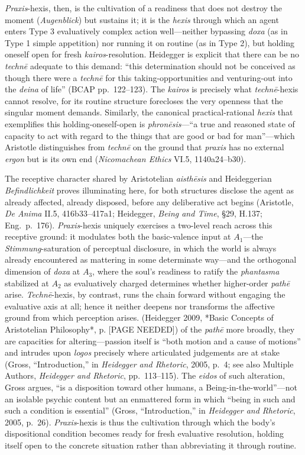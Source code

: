 \documentclass{article}
\begin{document}
\textit{Praxis}-hexis, then, is the cultivation of a readiness that does not destroy the moment (\textit{Augenblick}) but sustains it; it is the \textit{hexis} through which an agent enters Type 3 evaluatively complex action well---neither bypassing \textit{doxa} (as in Type 1 simple appetition) nor running it on routine (as in Type 2), but holding oneself open for fresh \textit{kairos}-resolution. Heidegger is explicit that there can be no \textit{techn\=e} adequate to this demand: ``this determination should not be conceived as though there were a \textit{techn\=e} for this taking-opportunities and venturing-out into the \textit{deina} of life'' (BCAP pp.~122--123). The \textit{kairos} is precisely what \textit{techn\=e}-hexis cannot resolve, for its routine structure forecloses the very openness that the singular moment demands. Similarly, the canonical practical-rational \textit{hexis} that exemplifies this holding-oneself-open is \textit{phron\=esis}---``a true and reasoned state of capacity to act with regard to the things that are good or bad for man''---which Aristotle distinguishes from \textit{techn\=e} on the ground that \textit{praxis} has no external \textit{ergon} but is its own end (\textit{Nicomachean Ethics} VI.5, 1140a24--b30).

The receptive character shared by Aristotelian \textit{aisth\=esis} and Heideggerian \textit{Befindlichkeit} proves illuminating here, for both structures disclose the agent as already affected, already disposed, before any deliberative act begins (Aristotle, \textit{De Anima} II.5, 416b33--417a1; Heidegger, \textit{Being and Time}, \S 29, H.137; Eng.~p.~176). \textit{Praxis}-hexis uniquely exercises a two-level reach across this receptive ground: it modulates both the basic-valence input at $A_1$---the \textit{Stimmung}-saturation of perceptual disclosure, in which the world is always already encountered as mattering in some determinate way---and the orthogonal dimension of \textit{doxa} at $A_3$, where the soul's readiness to ratify the \textit{phantasma} stabilized at $A_2$ as evaluatively charged determines whether higher-order \textit{path\=e} arise. \textit{Techn\=e}-hexis, by contrast, runs the chain forward without engaging the evaluative axis at all; hence it neither deepens nor transforms the affective ground from which perception arises. (Heidegger 2009, *Basic Concepts of Aristotelian Philosophy*, p. [PAGE NEEDED]) of the \textit{path\=e} more broadly, they are capacities for altering---passion itself is ``both motion and a cause of motions'' and intrudes upon \textit{logos} precisely where articulated judgements are at stake (Gross, ``Introduction,'' in \textit{Heidegger and Rhetoric}, 2005, p.~4; see also Multiple Authors, \textit{Heidegger and Rhetoric}, pp.~113--115). The \textit{eidos} of such alteration, Gross argues, ``is a disposition toward other humans, a Being-in-the-world''---not an isolable psychic content but an enmattered form in which ``being in such and such a condition is essential'' (Gross, ``Introduction,'' in \textit{Heidegger and Rhetoric}, 2005, p.~26). \textit{Praxis}-hexis is thus the cultivation through which the body's dispositional condition becomes ready for fresh evaluative resolution, holding itself open to the concrete situation rather than abbreviating it through routine.
\end{document}
